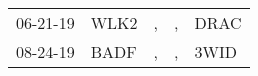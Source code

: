 \begin{supertabular}{lllll}
 06-21-19 &  WLK2 &  , &  , &  DRAC \\
 08-24-19 &  BADF &  , &  , &  3WID \\
\end{supertabular}
